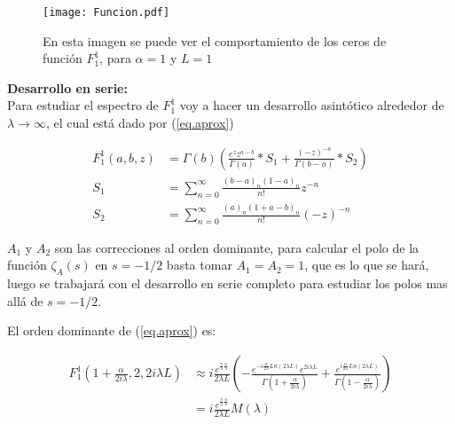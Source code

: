 \begin{figure}[h!]
\centering
\texttt{[image: Funcion.pdf]}
\caption{En esta imagen se puede ver el comportamiento de los ceros de función $F _1 ^1$, para $\alpha=1$ y $L=1$}
\label{fig:funcion}
\end{figure}

\textbf{Desarrollo en serie:} \\

Para estudiar el espectro de $F _1 ^1$ voy a hacer un desarrollo asintótico alrededor de $\lambda \rightarrow \infty$, el cual está dado por (\ref{eq.aprox})


\begin{equation}
\begin{aligned}
    F _1 ^1 (a,b,z) &= \Gamma (b) 
    \left(
    \frac{e^z z ^{a-b} }{\Gamma(a)} * S_1 + \frac{(-z) ^{ -a}}{ \Gamma(b-a)} 
    * S_2
    \right) \\[5pt]
    S _1 &= \sum _{n=0} ^{\infty} \frac{(b-a) _n (1-a) _n}{n!} z ^{-n} \\[5pt]
    S _2 &= \sum _{n=0} ^{\infty} \frac{(a) _n (1+a-b) _n}{n!} (-z) ^{-n} 
\end{aligned}
\label{eq.aprox}
\end{equation}

$A_1$ y $A _2$ son las correcciones al orden dominante, para calcular el polo de la función $\zeta _A (s)$ en $s=-1/2$ basta tomar $A _1 = A _2 = 1$, que es lo que se hará, luego se trabajará con el desarrollo en serie completo para estudiar los polos mas allá de $s=-1/2$. 



El orden dominante de (\ref{eq.aprox}) es:

\begin{equation}
\begin{aligned}
    F _1 ^1 (1+  \frac{  \alpha}{2 i \lambda} ,2 ,2 i \lambda L  ) & \approx 
    i  \frac{e ^{ \frac{\pi}{4} \frac{\alpha}{\lambda} } }{2 \lambda L}
    \left( -
    \frac{e ^{- i \frac{\alpha}{2 \lambda} Ln(2 \lambda L) } e ^{2 i \lambda L} }{\Gamma(1+\frac{ \alpha}{2 i \lambda})} +
    \frac{e ^{  i \frac{\alpha}{2 \lambda} Ln(2 \lambda L) }}               {\Gamma(1-\frac{ \alpha}{2 i \lambda})}
    \right) \\[5pt]  
    &=  i  \frac{e ^{ \frac{\pi}{4} \frac{\alpha}{\lambda} } }{2 \lambda L}     M (\lambda) 
\end{aligned}
\label{eq.completa}
\end{equation}

